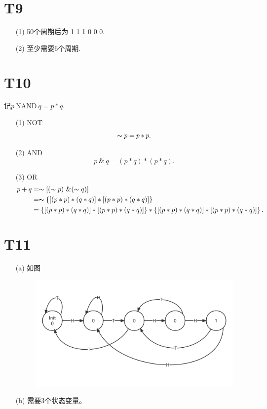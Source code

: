 \documentclass{article}
\begin{document}
\section*{T9}
    \begin{enumerate}
        \item [(1)]50个周期后为 1	1	1	0	0	0.
        \item [(2)]至少需要6个周期.
    \end{enumerate}
\section*{T10}
    记$p\ $NAND$\ q=p*q$.
    \begin{enumerate}
        \item [(1)]NOT
        \[  \thicksim p = p*p.   \]
        \item [(2)]AND
        \[  p\ \&\ q  =\left(p*q\right)*\left(p*q\right).  \]
        \item [(3)]OR
        \begin{align*}
            p+q &= \thicksim \left[(\thicksim p)\  \& (\thicksim q)\right]\\
            &=\thicksim\left\{ \left[(p*p)*(q*q) \right]*\left[(p*p)*(q*q) \right]\right\}\\
            &=\left\{ \left[(p*p)*(q*q) \right]*\left[(p*p)*(q*q) \right]\right\}*\left\{ \left[(p*p)*(q*q) \right]*\left[(p*p)*(q*q) \right]\right\}.
        \end{align*}
    \end{enumerate}
\section*{T11}
\begin{enumerate}
    \item [(a)]如图
    \begin{figure}[htbp]
        \centering
        \includegraphics[scale=0.15]{picture/t11.png}
    \end{figure}
    \item [(b)]需要3个状态变量。
\end{enumerate}
\end{document}
